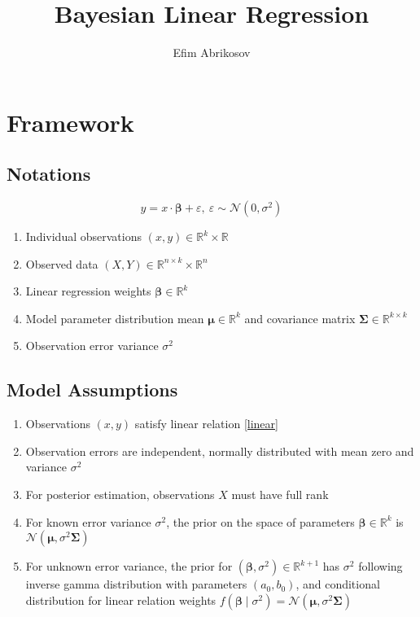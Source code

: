 \documentclass[10pt,fleqn]{amsart}
\theoremstyle{definition}
\theoremstyle{remark}
\numberwithin{equation}{section}
\newcommand{\RR}{\mathbb{R}}
\newcommand{\bbeta}{\boldsymbol{\beta}}
\newcommand{\mmu}{\boldsymbol{\mu}}
\newcommand{\SSigma}{\boldsymbol{\Sigma}}
\begin{document}
\title{Bayesian Linear Regression}
\author{Efim Abrikosov}
\maketitle

\section{Framework}
\subsection{Notations}
\begin{equation}\label{linear}
    y = x\cdot \bbeta +\varepsilon,\ \varepsilon \sim\mathcal{N}(0,\sigma^2)
\end{equation}

\begin{enumerate}
    \item Individual observations $(x, y) \in \RR^k\times \RR$
    \item Observed data $(X, Y)\in \RR^{n\times k}\times \RR^n$
    \item Linear regression weights  $\bbeta \in \RR^k$
    \item Model parameter distribution mean $\mmu \in \RR^k$ and covariance matrix $\SSigma \in \RR^{k\times k}$
    \item Observation error variance $\sigma^2$
\end{enumerate}

\subsection{Model Assumptions}
\begin{enumerate}
    \item Observations $(x, y)$ satisfy linear relation \ref{linear}
    \item Observation errors are independent, normally distributed with
    mean zero and variance $\sigma^2$
    \item For posterior estimation, observations $X$ must have full rank
    \item For known error variance $\sigma^2$, the prior on the space of parameters $\bbeta\in\RR^k$ is $\mathcal{N}(\mmu,\sigma^2\SSigma)$
    \item For unknown error variance, the prior for $(\bbeta, \sigma^2)\in\RR^{k+1}$ has $\sigma^2$ following
    inverse gamma distribution with parameters $(a_0, b_0)$, and conditional distribution for linear relation weights $f(\bbeta\mid\sigma^2)=\mathcal{N}(\mmu,\sigma^2\SSigma)$
\end{enumerate}
\end{document}
